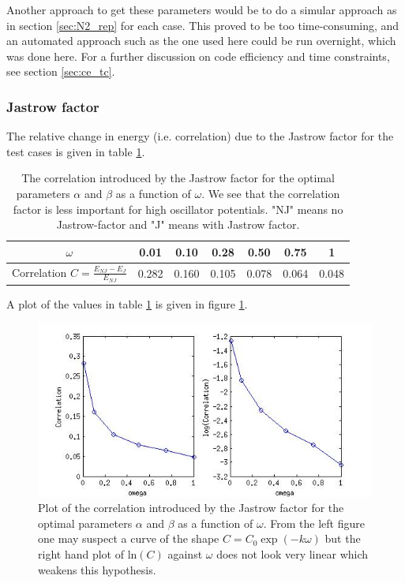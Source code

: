 Another approach to get these parameters would be to do a simular approach as in section \ref{sec:N2_rep} for each case. 
This proved to be too time-consuming, and an automated approach such as the one used here could be run overnight, which was done here. 
For a further discussion on code efficiency and time constraints, see section \ref{sec:ce_tc}.



\subsubsection{Jastrow factor}\label{sec:res_jastrow}

The relative change in energy (i.e. correlation) due to the Jastrow factor for the test cases is given in table \ref{tab:correlations_jastrow}.

\begin{table}[h!]
	\centering
	\begin{tabular}{ccccccc}
	\toprule
	$\omega$	& 0.01 & 0.10 & 0.28 & 0.50 & 0.75 & 1 \\
	\midrule
	Correlation $C = \frac{E_{NJ} - E_{J}}{E_{NJ}}$ & 0.282 & 0.160 & 0.105 & 0.078 & 0.064 & 0.048 \\
	\bottomrule
	\end{tabular}
	\caption{The correlation introduced by the Jastrow factor for the optimal parameters $\alpha$ and $\beta$ as a function of $\omega$. 
	We see that the correlation factor is less important for high oscillator potentials.
	"NJ" means no Jastrow-factor and "J" means with Jastrow factor.}
	\label{tab:correlations_jastrow}
\end{table}

A plot of the values in table \ref{tab:correlations_jastrow} is given in figure \ref{fig:correlations_jastrow}. 

\begin{figure}[h!]
	\centering 
	\includegraphics[width=\textwidth]{results/correlations_jastrow.jpg}
	\caption{Plot of the correlation introduced by the Jastrow factor for the optimal parameters $\alpha$ and $\beta$ as a function of $\omega$. 
	From the left figure one may suspect a curve of the shape $C = C_0 \exp(-k\omega)$ but the right hand plot of $\textrm{ln}(C)$ against $\omega$ does not look very linear which weakens this hypothesis.}
	\label{fig:correlations_jastrow}
\end{figure}

